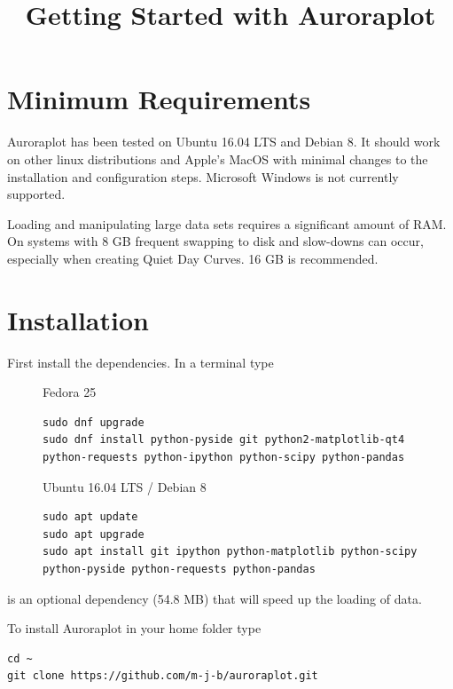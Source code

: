 \documentclass{article}
\begin{document}
\title{Getting Started with Auroraplot}
\maketitle

\section{Minimum Requirements}

Auroraplot has been tested on Ubuntu 16.04 LTS and Debian 8.
It should work on other linux distributions and Apple's MacOS with minimal changes to the installation and configuration steps. Microsoft Windows is not currently supported.

Loading and manipulating large data sets requires a significant amount of RAM.
On systems with 8 GB frequent swapping to disk and slow-downs can occur,
especially when creating Quiet Day Curves. 16 GB is recommended.

\section{Installation}
\label{install}

First install the dependencies. In a terminal type

\begin{figure}[htb!]
\begin{minipage}[b]{0.45\linewidth}
Fedora 25
\begin{lstlisting}
sudo dnf upgrade
sudo dnf install python-pyside git python2-matplotlib-qt4 python-requests python-ipython python-scipy python-pandas
\end{lstlisting}
\end{minipage}
\hspace{0.5cm}
\begin{minipage}[b]{0.45\linewidth}
Ubuntu 16.04 LTS / Debian 8
\begin{lstlisting}
sudo apt update
sudo apt upgrade                 
sudo apt install git ipython python-matplotlib python-scipy python-pyside python-requests python-pandas 
\end{lstlisting}
\end{minipage} 
\end{figure}

 is an optional dependency (54.8 MB) that will speed up the loading of data.

To install Auroraplot in your home folder type
\begin{lstlisting}
cd ~
git clone https://github.com/m-j-b/auroraplot.git
\end{lstlisting}
\end{document}

